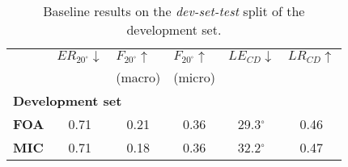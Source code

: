 \documentclass{article}
\begin{document}
\begin{sloppy}
\begin{table}[t]
\begin{adjustbox}{max width=\columnwidth}
\begin{tabular}{lccccc}
                                  & \multicolumn{1}{l}{$ER_{20^\circ{}}\downarrow$} & \multicolumn{1}{l}{$F_{20^\circ{}}\uparrow$} & \multicolumn{1}{l}{$F_{20^\circ{}}\uparrow$} & \multicolumn{1}{l}{$LE_{CD}\downarrow$} & \multicolumn{1}{l}{$LR_{CD}\uparrow$} \\
                                  &  & (macro) & (micro) &  &  \\                                  
\hline
\multicolumn{6}{l}{\textbf{Development set}}                                                                                                                                                                                          \\ \hline
\multicolumn{1}{l|}{\textbf{FOA}} & 0.71                                & 0.21                                       & 0.36                                       & 29.3$^\circ$                           & 0.46                            \\
\multicolumn{1}{l|}{\textbf{MIC}} & 0.71                                & 0.18                                       & 0.36                                       & 32.2$^\circ$                           & 0.47                            \\ \hline
\end{tabular}
\end{adjustbox}
\caption{Baseline results on the \emph{dev-set-test} split of the development set.}
\label{table:baseline_results}
\end{table} 

\end{sloppy}
\end{document}
